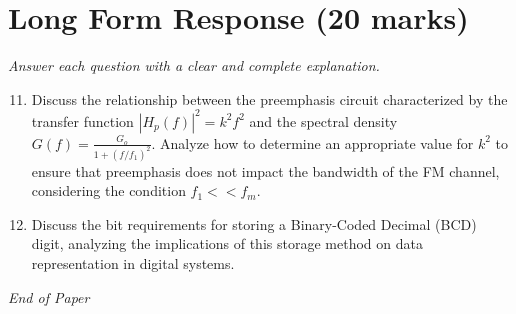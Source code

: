 \documentclass[12pt]{article}
\begin{document}
\section*{Long Form Response (20 marks)}
\textit{Answer each question with a clear and complete explanation.}
\begin{enumerate}[label=\arabic*.]
\setcounter{enumi}{10}
\item Discuss the relationship between the preemphasis circuit characterized by the transfer function \(|H_p(f)|^2 = k^2 f^2\) and the spectral density \(G(f) = \frac{G_o}{1 + (f/f_1)^2}\). Analyze how to determine an appropriate value for \(k^2\) to ensure that preemphasis does not impact the bandwidth of the FM channel, considering the condition \(f_1 << f_m\).
\item Discuss the bit requirements for storing a Binary-Coded Decimal (BCD) digit, analyzing the implications of this storage method on data representation in digital systems.
\end{enumerate}

\vfill
\noindent\textit{End of Paper}
\end{document}

